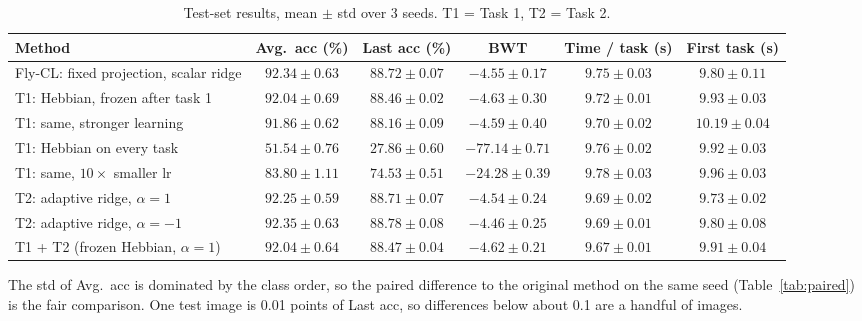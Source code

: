 \documentclass[11pt,a4paper]{article}
\begin{document}
\begin{table}[h]
\centering
\caption{Test-set results, mean $\pm$ std over 3 seeds. T1 = Task 1, T2 = Task 2.}
\label{tab:main}
\small
\begin{tabularx}{\textwidth}{Lccccc}
\toprule
Method & Avg.\ acc (\%) & Last acc (\%) & BWT & Time / task (s) & First task (s) \\
\midrule
Fly-CL: fixed projection, scalar ridge & $92.34 \pm 0.63$ & $88.72 \pm 0.07$ & $-4.55 \pm 0.17$ & $9.75 \pm 0.03$ & $9.80 \pm 0.11$ \\
T1: Hebbian, frozen after task 1       & $92.04 \pm 0.69$ & $88.46 \pm 0.02$ & $-4.63 \pm 0.30$ & $9.72 \pm 0.01$ & $9.93 \pm 0.03$ \\
T1: same, stronger learning            & $91.86 \pm 0.62$ & $88.16 \pm 0.09$ & $-4.59 \pm 0.40$ & $9.70 \pm 0.02$ & $10.19 \pm 0.04$ \\
T1: Hebbian on every task              & $51.54 \pm 0.76$ & $27.86 \pm 0.60$ & $-77.14 \pm 0.71$ & $9.76 \pm 0.02$ & $9.92 \pm 0.03$ \\
T1: same, $10\times$ smaller lr        & $83.80 \pm 1.11$ & $74.53 \pm 0.51$ & $-24.28 \pm 0.39$ & $9.78 \pm 0.03$ & $9.96 \pm 0.03$ \\
T2: adaptive ridge, $\alpha = 1$       & $92.25 \pm 0.59$ & $88.71 \pm 0.07$ & $-4.54 \pm 0.24$ & $9.69 \pm 0.02$ & $9.73 \pm 0.02$ \\
T2: adaptive ridge, $\alpha = -1$      & $92.35 \pm 0.63$ & $88.78 \pm 0.08$ & $-4.46 \pm 0.25$ & $9.69 \pm 0.01$ & $9.80 \pm 0.08$ \\
T1 + T2 (frozen Hebbian, $\alpha = 1$) & $92.04 \pm 0.64$ & $88.47 \pm 0.04$ & $-4.62 \pm 0.21$ & $9.67 \pm 0.01$ & $9.91 \pm 0.04$ \\
\bottomrule
\end{tabularx}
\end{table}

The std of Avg.\ acc is dominated by the class order, so the paired difference to the original
method on the same seed (Table~\ref{tab:paired}) is the fair comparison. One test image is 0.01
points of Last acc, so differences below about 0.1 are a handful of images.
\end{document}
